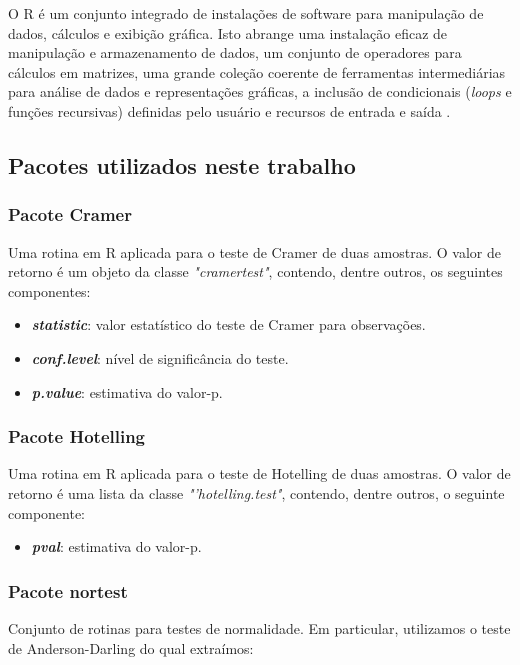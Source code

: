 O R é um conjunto integrado de instalações de software para manipulação de dados, cálculos e exibição gráfica. Isto abrange uma instalação eficaz de manipulação e armazenamento de dados, um conjunto de operadores para cálculos em matrizes, uma grande coleção coerente de ferramentas intermediárias para análise de dados e representações gráficas, a inclusão de condicionais (\textit{loops} e funções recursivas) definidas pelo usuário e recursos de entrada e saída \cite{languageR}.

\subsection{Pacotes utilizados neste trabalho}

\subsubsection{Pacote Cramer}
Uma rotina em R aplicada para o teste de Cramer de duas amostras. O valor de retorno é um objeto da classe \textit{"cramertest"}, contendo, dentre outros, os seguintes componentes:

\begin{itemize}
   \item \textit{\textbf{statistic}}: valor estatístico do teste de Cramer para observações.
   \item \textit{\textbf{conf.level}}: nível de significância do teste.
   \item \textit{\textbf{p.value}}: estimativa do valor-p.
 \end{itemize}  

\subsubsection{Pacote Hotelling}
Uma rotina em R aplicada para o teste de Hotelling de duas amostras. O valor de retorno é uma lista da classe \textit{"’hotelling.test"}, contendo, dentre outros, o seguinte componente:

\begin{itemize}
   \item \textit{\textbf{pval}}: estimativa do valor-p.
 \end{itemize} 

\subsubsection{Pacote nortest}

Conjunto de rotinas para testes de normalidade. Em particular, utilizamos o teste de Anderson-Darling do qual extraímos:


